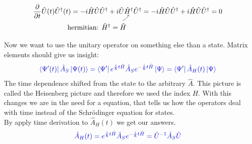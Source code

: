 \documentclass[12pt, titlepage]{article}
\begin{document}
\begin{equation*}
  \frac{\partial}{\partial t}\hat{U}(t)\hat{U}^{\dagger}(t)=-i\hat{H}\hat{U}\hat{U}^{\dagger}+i\hat{U}
  \underset{\mathllap{
    \begin{tikzpicture}
      \draw[->] (-0.3, 0) to[bend right=20] ++(0.3,2ex);
      \node[below left] at (0,0) {hermitian: $ \hat{H}^{\dagger}= \hat{H} $};
    \end{tikzpicture}
  }}{\hat{H}^{\dagger}}
  \hat{U}^{\dagger}  
  =-i\hat{H}\hat{U}\hat{U}^{\dagger}+i\hat{H}\hat{U}\hat{U}^{\dagger}=0
\end{equation*}

Now we want to use the unitary operator on something else than a state. Matrix elements should give us insight:
\\
\begin{equation}\label{eq:matrix_ele_time_dep}
\textcolor[RGB]{0,0,204}{
\bra{\Psi^{\prime}(t)}\hat{A}_{S}\ket{\Psi (t)}
=\bra{\Psi^{\prime}}e^{\frac{i}{\hbar}t\hat{H}}\hat{A}_{S}
e^{-\frac{i}{\hbar}t\hat{H}}\ket{\Psi }
=\bra{\Psi^{\prime}}\hat{A}_{H}(t)\ket{\Psi}
}
\end{equation}
The time dependence shifted from the state to the arbitrary $ \hat{A} $. This picture is called the Heisenberg picture and therefore we used the index $ H $. With this changes we are in the need for a equation, that tells us how the operators deal with time instead of the Schrödinger equation for states.
\\By apply time derivation to $ \hat{A}_{H}(t) $ we get our answers.
\begin{equation}\label{eq:S-H-Operator_Trafo}
\textcolor[RGB]{0,0,204}{
\hat{A}_{H}(t)=e^{\frac{i}{\hbar}t\hat{H}}\hat{A}_{S}
e^{-\frac{i}{\hbar}t\hat{H}}=\hat{U}^{-1}\hat{A}_{S}\hat{U}
}
\end{equation}
\end{document}
